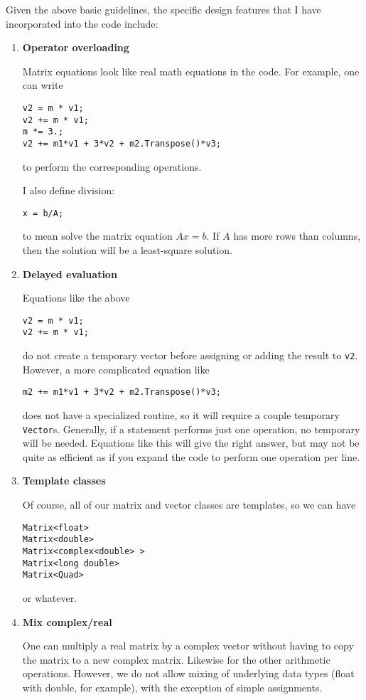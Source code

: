 \documentclass[twoside,letterpaper,11pt]{article}
\renewcommand{\tt}[1]{{\texttt {#1}}}
\begin{document}
Given the above basic guidelines, the specific design features that I 
have incorporated into the code include:

\begin{enumerate}
\item
\textbf{Operator overloading}

Matrix equations look like real math equations in the code. 
For example, one can write 
\begin{verbatim}
v2 = m * v1;
v2 += m * v1;
m *= 3.;
v2 += m1*v1 + 3*v2 + m2.Transpose()*v3;
\end{verbatim} 
to perform the corresponding operations.

I also define division:
\begin{verbatim}
x = b/A;
\end{verbatim}
to mean solve the matrix equation $A x = b$.  If $A$ has more rows than columns,
then the solution will be a least-square solution.

\item
\textbf{Delayed evaluation}

Equations like the above 
\begin{verbatim}
v2 = m * v1;
v2 += m * v1;
\end{verbatim}
do not create a temporary vector before assigning or adding the result to \tt{v2}. 
However, a more complicated equation like
\begin{verbatim}
m2 += m1*v1 + 3*v2 + m2.Transpose()*v3;
\end{verbatim}
does not have a specialized routine, 
so it will require a couple temporary \tt{Vector}s.
Generally, if a statement performs just one operation, no temporary will be needed.  
Equations like this will give the right answer, but may not be quite as efficient as if you expand
the code to perform one operation per line.

\item
\textbf{Template classes}

Of course, all of our matrix and vector classes are templates, so we can have 
\begin{verbatim}
Matrix<float>
Matrix<double>
Matrix<complex<double> >
Matrix<long double>
Matrix<Quad>
\end{verbatim}
or whatever.

\item
\textbf{Mix complex/real}

One can multiply a real matrix by a complex
vector without having to copy the matrix to a new complex matrix.  Likewise
for the other arithmetic operations.  
However, we
do not allow mixing of underlying data types (float with double, for example), 
with the exception of simple assignments.


\end{enumerate}
\end{document}
